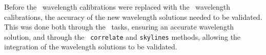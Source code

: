 Before the \polsalt\ wavelength calibrations were replaced with the \iraf\ wavelength calibrations, the accuracy of the new wavelength solutions needed to be validated. This was done both through the \iraf\ tasks, ensuring an accurate wavelength solution, and through the \stops\ \texttt{correlate} and \texttt{skylines} methods, allowing the integration of the wavelength solutions to be validated.







